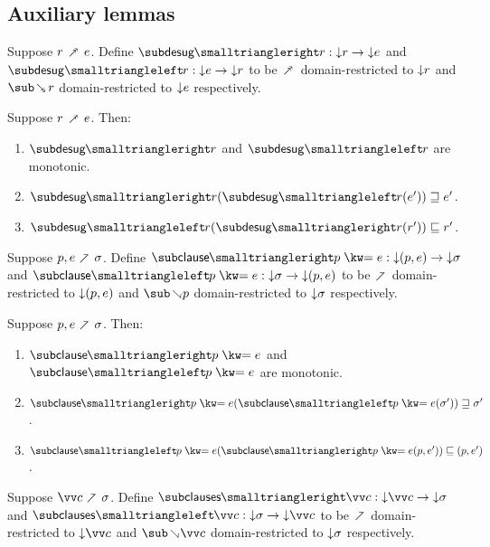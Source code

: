 \subsection{Auxiliary lemmas}

\begin{definition}
   Suppose $r \desugarFwdR e$. Define $\listRestFwdF{r}: \Below{r} \to \Below{e}$ and $\listRestBwdF{r}: \Below{e} \to \Below{r}$ to be $\desugarFwdR$ domain-restricted to ${\downarrow}{r}$ and $\desugarBwdR{r}$ domain-restricted to ${\downarrow}{e}$ respectively.
\end{definition}

\begin{lemma}
  \label{lem:aux:desugarlistrest:gc}
  Suppose $r \desugarFwdR e$. Then:
  \begin{enumerate}
     \item $\listRestFwdF{r}$ and $\listRestBwdF{r}$ are monotonic.
     \item $\listRestFwdF{r}(\listRestBwdF{r}(e')) \geq e'$.
     \item $\listRestBwdF{r}(\listRestFwdF{r}(r')) \leq r'$.
  \end{enumerate}
\end{lemma}

\begin{definition}
   Suppose $p, e \clauseFwdR \sigma$. Define $\clauseFwdF{\clause{p}{e}}: \Below{(p,e)} \to \Below{\sigma}$ and $\clauseBwdF{\clause{p}{e}}: \Below{\sigma} \to \Below{(p,e)}$ to be $\clauseFwdR$ domain-restricted to ${\downarrow}{(p,e)}$ and $\clauseBwdR{p}$ domain-restricted to ${\downarrow}{\sigma}$ respectively.
\end{definition}

\begin{lemma}
  \label{lem:aux:clause:gc}
  Suppose $p, e \clauseFwdR \sigma$. Then:
  \begin{enumerate}
     \item $\clauseFwdF{\clause{p}{e}}$ and $\clauseBwdF{\clause{p}{e}}$ are monotonic.
     \item $\clauseFwdF{\clause{p}{e}}(\clauseBwdF{\clause{p}{e}}(\sigma')) \geq \sigma'$.
     \item $\clauseBwdF{\clause{p}{e}}(\clauseFwdF{\clause{p}{e}}(p,e')) \leq (p,e')$.
  \end{enumerate}
\end{lemma}

\begin{definition}
   Suppose $\vec{c} \clauseFwdR \sigma$. Define $\desugarClausesFwdF{\vec{c}}: \Below{\vec{c}} \to \Below{\sigma}$ and $\desugarClausesBwdF{\vec{c}}: \Below{\sigma} \to \Below{\vec{c}}$ to be $\clauseFwdR$ domain-restricted to $\Below{\vec{c}}$ and $\clauseBwdR{\vec{c}}$ domain-restricted to ${\downarrow}{\sigma}$ respectively.
\end{definition}


